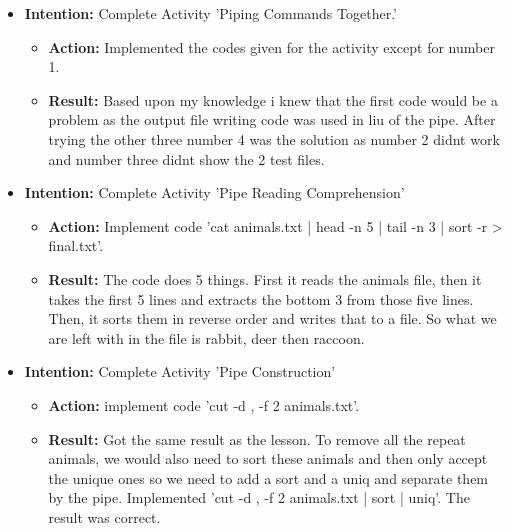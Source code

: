 \documentclass{article}
\begin{document}
\begin{itemize}
\begin{itemize}
\end{itemize}

\item{\textbf{Intention:} Complete Activity 'Piping Commands Together.'}

\begin{itemize}
\item{\textbf{Action:} Implemented the codes given for the activity except for number 1.}

\item{\textbf{Result:} Based upon my knowledge i knew that the first code would be a problem as the output file writing code was used in liu of the pipe. After trying the other three number 4 was the solution as number 2 didnt work and number three didnt show the 2 test files.}

\end{itemize}

\item{\textbf{Intention:} Complete Activity 'Pipe Reading Comprehension'}

\begin{itemize}
\item{\textbf{Action:} Implement code 'cat animals.txt | head -n 5 | tail -n 3 | sort -r > final.txt'.}

\item{\textbf{Result:} The code does 5 things. First it reads the animals file, then it takes the first 5 lines and extracts the bottom 3 from those five lines. Then, it sorts them in reverse order and writes that to a file. So what we are left with in the file is rabbit, deer then raccoon.}

\end{itemize}

\item{\textbf{Intention:} Complete Activity 'Pipe Construction'}

\begin{itemize}
\item{\textbf{Action:} implement code 'cut -d , -f 2 animals.txt'.}

\item{\textbf{Result:} Got the same result as the lesson. To remove all the repeat animals, we would also need to sort these animals and then only accept the unique ones so we need to add a sort and a uniq and separate them by the pipe. Implemented 'cut -d , -f 2 animals.txt | sort | uniq'. The result was correct.}

\end{itemize}


\end{itemize}
\end{document}
